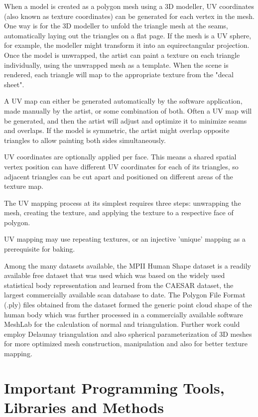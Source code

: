 \documentclass{article}
\begin{document}
When a model is created as a polygon mesh using a 3D modeller, UV coordinates (also known as texture coordinates) can be generated for each vertex in the mesh. One way is for the 3D modeller to unfold the triangle mesh at the seams, automatically laying out the triangles on a flat page. If the mesh is a UV sphere, for example, the modeller might transform it into an equirectangular projection. Once the model is unwrapped, the artist can paint a texture on each triangle individually, using the unwrapped mesh as a template. When the scene is rendered, each triangle will map to the appropriate texture from the "decal sheet".

A UV map can either be generated automatically by the software application, made manually by the artist, or some combination of both. Often a UV map will be generated, and then the artist will adjust and optimize it to minimize seams and overlaps. If the model is symmetric, the artist might overlap opposite triangles to allow painting both sides simultaneously.

UV coordinates are optionally applied per face. This means a shared spatial vertex position can have different UV coordinates for each of its triangles, so adjacent triangles can be cut apart and positioned on different areas of the texture map.

The UV mapping process at its simplest requires three steps: unwrapping the mesh, creating the texture, and applying the texture to a respective face of polygon.

UV mapping may use repeating textures, or an injective 'unique' mapping as a prerequisite for baking.

Among the many datasets available, the MPII Human Shape dataset is a readily available free dataset that was used which was based on the widely used statistical body representation and learned from the CAESAR dataset, the largest commercially available scan database to date. The Polygon File Format (.ply) files obtained from the dataset formed the generic point cloud shape of the human body which was further processed in a commercially available software MeshLab for the calculation of normal and triangulation. Further work could employ Delaunay triangulation and also spherical parameterization of 3D meshes for more optimized mesh construction, manipulation and also for better texture mapping.

\newpage
\section{Important Programming Tools, Libraries and Methods}
\end{document}
